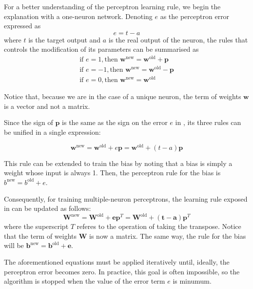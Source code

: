 For a better understanding of the perceptron learning rule, 
we begin the explanation with a one-neuron network. 
Denoting $e$ as the perceptron error expressed as
\begin{equation}
e=t-a
\end{equation}
where $t$ is the target output and $a$ is the real output of the neuron, the rules that controls the modification of its parameters can be summarised as \cite{Demuth:2014:NND:2721661}
\begin{equation}
\begin{align*}
\text{if } e=1,
\text{then } \mathbf{w}^{\text{new}} = \mathbf{w}^{\text{old}}+\mathbf{p}\\
\text{if } e=-1,
\text{then } \mathbf{w}^{\text{new}} = \mathbf{w}^{\text{old}}-\mathbf{p}\\
\text{if } e=0,
\text{then } \mathbf{w}^{\text{new}} = \mathbf{w}^{\text{old}}
\end{align*}
\label{eq:perceptron3rules}
\end{equation}

Notice that, because we are in the case of a unique neuron, the term of weights $\mathbf{w}$ is a vector and not a matrix. 

Since the sign of $\mathbf{p}$ is the same as the sign on the error $e$ in , its three rules can be unified in a single expression:

\begin{equation}
\mathbf{w}^{\text{new}} = \mathbf{w}^{\text{old}}+e\mathbf{p} = \mathbf{w}^{\text{old}}+(t-a)\mathbf{p}
\label{eq:perceptron1rule}
\end{equation}

This rule can be extended to train the bias by noting that a bias is simply a weight whose input is always 1.
Then, the perceptron rule for the bias is 
$b^{\text{new}}=b^{\text{old}}+e$.

Consequently, for training multiple-neuron perceptrons, the learning rule exposed in  can be updated as follows:
\begin{equation}
\mathbf{W}^{\text{new}} = \mathbf{W}^{\text{old}}+\mathbf{e}\mathbf{p}^{T} = \mathbf{W}^{\text{old}}+(\mathbf{t}-\mathbf{a})\mathbf{p}^{T}
\label{eq:perceptron1rule}
\end{equation}
where the superscript $T$ referes to the operation of taking the transpose. Notice that the term of weights $\mathbf{W}$ is now a matrix. The same way, the rule for the bias will be $\mathbf{b}^{\text{new}}=\mathbf{b}^{\text{old}}+\mathbf{e}$.

The aforementioned equations must be applied iteratively until, ideally, the perceptron error becomes zero. In practice, this goal is often impossible, so the algorithm is stopped when the value of the error term $e$ is minumum.



